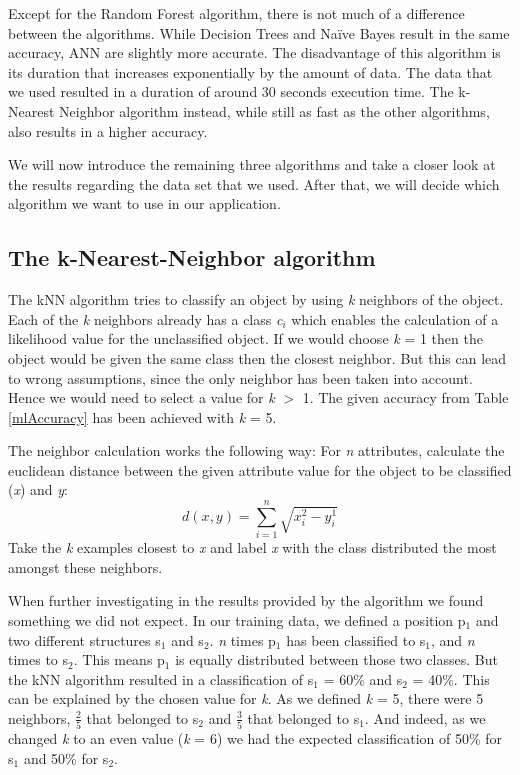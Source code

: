 Except for the Random Forest algorithm, there is not much of a difference between the algorithms. While Decision Trees and Na{\"i}ve Bayes result in the same accuracy, ANN are slightly more accurate. The disadvantage of this algorithm is its duration that increases exponentially by the amount of data. The data that we used resulted in a duration of around 30 seconds execution time. The k-Nearest Neighbor algorithm instead, while still as fast as the other algorithms, also results in a higher accuracy.

We will now introduce the remaining three algorithms and take a closer look at the results regarding the data set that we used. After that, we will decide which algorithm we want to use in our application.

\subsection{The k-Nearest-Neighbor algorithm}
\label{sec4.2.1}
The kNN algorithm tries to classify an object by using \emph{k} neighbors of the object. Each of the \emph{k} neighbors already has a class \emph{c$_i$} which enables the calculation of a likelihood value for the unclassified object.
If we would choose \emph{k} = 1 then the object would be given the same class then the closest neighbor. But this can lead to wrong assumptions, since the only neighbor has been taken into account. Hence we would need to select a value for \emph{k} $>$ 1. The given accuracy from Table \ref{mlAccuracy} has been achieved with \emph{k} = 5.

The neighbor calculation works the following way: For \emph{n} attributes, calculate the euclidean distance between the given attribute value for the object to be classified (\emph{x}) and \emph{y}:
\[
d(x, y) = \sum\limits_{i=1}^n \sqrt{x_i^2 - y_i^1}
\]
Take the \emph{k} examples closest to \emph{x} and label \emph{x} with the class distributed the most amongst these neighbors.

When further investigating in the results provided by the algorithm we found something we did not expect. In our training data, we defined a position p$_1$ and two different structures s$_1$ and s$_2$. \emph{n} times p$_1$ has been classified to s$_1$, and \emph{n} times to s$_2$. This means p$_1$ is equally distributed between those two classes. But the kNN algorithm resulted in a classification of s$_1$ = 60\% and s$_2$ = 40\%. This can be explained by the chosen value for \emph{k}. As we defined \emph{k} = 5, there were 5 neighbors, $\frac{2}{5}$ that belonged to s$_2$ and $\frac{3}{5}$ that belonged to s$_1$. And indeed, as we changed \emph{k} to an even value (\emph{k} = 6) we had the expected classification of 50\% for s$_1$ and 50\% for s$_2$.

